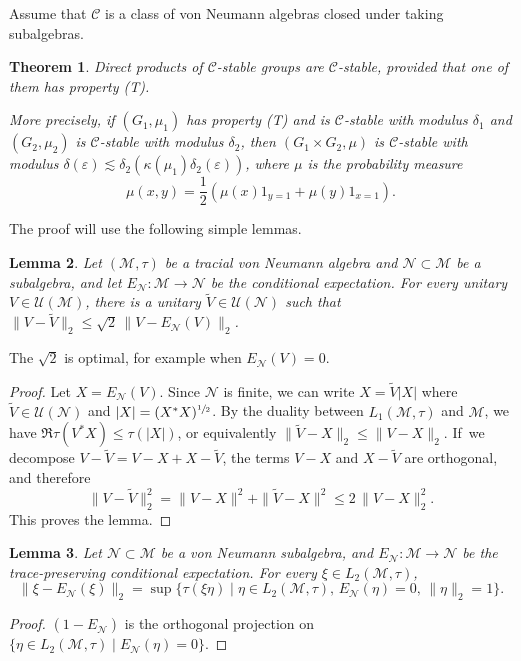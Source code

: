 \documentclass[10pt]{amsart}
\theoremstyle{plain}
\newtheorem{theorem}{Theorem}[section]
\newtheorem{lemma}[theorem]{Lemma}
\theoremstyle{definition}
\newcommand{\cM}{\mathcal{M}}
\newcommand{\cN}{\mathcal{N}}
\newcommand{\vn}{\mathcal{C}}
\newcommand{\cU}{\mathcal{U}}
\numberwithin{equation}{section}
\begin{document}
Assume that $\vn$ is a class of von Neumann algebras closed under taking subalgebras.

\begin{theorem}\label{thm:stability_direct_product} Direct products of $\vn$-stable groups are $\vn$-stable, provided that one of them has property (T).

More precisely, if $(G_1,\mu_1)$ has property (T) and is $\vn$-stable with modulus $\delta_1$ and $(G_2,\mu_2)$ is $\vn$-stable with modulus $\delta_2$, then $(G_1 \times G_2,\mu)$ is $\vn$-stable with modulus $\delta(\varepsilon) \lesssim \delta_2(\kappa(\mu_1) \delta_2(\varepsilon))$, where $\mu$ is the probability measure
\[
\mu(x,y) = \frac{1}{2}(\mu(x) 1_{y=1}+\mu(y) 1_{x=1}).
\]
\end{theorem}
The proof will use the following simple lemmas.
\begin{lemma}\label{eq:almost-unitary_close_to_unitary} Let $(\cM,\tau)$ be a tracial von Neumann algebra and $\cN\subset\cM$ be a subalgebra, and let $E_\cN:\cM \to \cN$ be the conditional expectation. For every unitary $V \in \cU(\cM)$, there is a unitary $\tilde{V}\in\cU(\cN)$ such that $\|V-\tilde{V}\|_2 \leq \sqrt{2}\, \|V-E_\cN(V)\|_2$.
\end{lemma}
The $\sqrt{2}$ is optimal, for example when $E_\cN(V)=0$.
\begin{proof} Let $X = E_\cN(V)$. Since $\cN$ is finite, we can write $X=\tilde{V}|X|$ where $\tilde{V} \in\cU(\cN)$ and $|X|=(X^*X)^{\sfrac 1 2}$. By the duality between $L_1(\cM,\tau)$ and $\cM$, we have $\Re \tau(V^*X) \leq\tau(|X|)$, or equivalently $\|\tilde{V}-X\|_2 \leq \|V-X\|_2$. If~we decompose $V-\tilde{V} = V-X + X-\tilde{V}$, the terms $V-X$ and $X-\tilde{V}$ are orthogonal, and therefore
\[
\|V-\tilde{V}\|_2^2 = \|V-X\|^2 + \|\tilde{V}-X\|^2 \leq 2\,\|V-X\|_2^2.
\]
This proves the lemma.
\end{proof}
\begin{lemma}\label{eq:norm_of_conditional_exp} Let $\cN\subset\cM$ be a von Neumann subalgebra, and $E_\cN:\cM\to\cN$ be the trace-preserving conditional expectation. For every $\xi \in L_2(\cM,\tau)$,
\[
\|\xi - E_\cN(\xi)\|_2 = \sup\{\tau(\xi \eta) \mid \eta \in L_2(\cM,\tau),\, E_\cN(\eta)=0,\,\|\eta\|_2 = 1\}.
\]
\end{lemma}
\begin{proof}
$(1-E_\cN)$ is the orthogonal projection on $\{\eta \in L_2(\cM,\tau) \mid E_\cN(\eta)=0\}$.
\end{proof}
\end{document}
